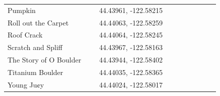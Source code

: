 \begin{flushleft}
\begin{center}
\begin{supertabular}{p{0.38\linewidth}p{0.5\linewidth}}
Pumpkin & 44.43961, -122.58215 \\
Roll out the Carpet & 44.44063, -122.58259 \\
Roof Crack & 44.44064, -122.58245 \\
Scratch and Spliff & 44.43967, -122.58163 \\
The Story of O Boulder & 44.43944, -122.58402 \\
Titanium Boulder & 44.44035, -122.58365 \\
Young Ju¢y & 44.44024, -122.58017 \\
\end{supertabular}
\end{center}

\end{flushleft}
